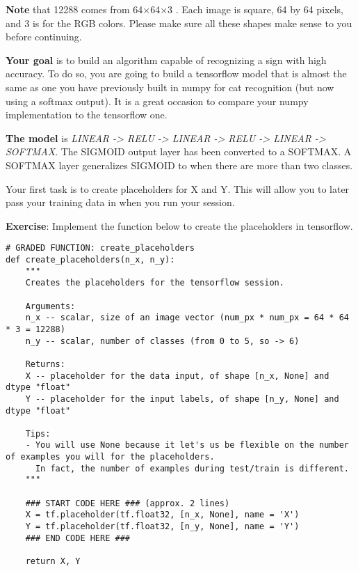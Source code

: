 {\textbf {Note}} that 12288 comes from  64×64×3 . Each image is square, 64 by 64 pixels, and 3 is for the RGB colors. Please make sure all these shapes make sense to you before continuing.

{\textbf {Your goal }}is to build an algorithm capable of recognizing a sign with high accuracy. To do so, you are going to build a tensorflow model that is almost the same as one you have previously built in numpy for cat recognition (but now using a softmax output). It is a great occasion to compare your numpy implementation to the tensorflow one.

{\textbf {The model }}is \emph{LINEAR -> RELU -> LINEAR -> RELU -> LINEAR -> SOFTMAX}. The SIGMOID output layer has been converted to a SOFTMAX. A SOFTMAX layer generalizes SIGMOID to when there are more than two classes.






Your first task is to create placeholders for X and Y. This will allow you to later pass your training data in when you run your session.

{\textbf {Exercise}}: Implement the function below to create the placeholders in tensorflow.

\begin{verbatim} 
# GRADED FUNCTION: create_placeholders
def create_placeholders(n_x, n_y):
    """
    Creates the placeholders for the tensorflow session.
    
    Arguments:
    n_x -- scalar, size of an image vector (num_px * num_px = 64 * 64 * 3 = 12288)
    n_y -- scalar, number of classes (from 0 to 5, so -> 6)
    
    Returns:
    X -- placeholder for the data input, of shape [n_x, None] and dtype "float"
    Y -- placeholder for the input labels, of shape [n_y, None] and dtype "float"
    
    Tips:
    - You will use None because it let's us be flexible on the number of examples you will for the placeholders.
      In fact, the number of examples during test/train is different.
    """

    ### START CODE HERE ### (approx. 2 lines)
    X = tf.placeholder(tf.float32, [n_x, None], name = 'X')
    Y = tf.placeholder(tf.float32, [n_y, None], name = 'Y')
    ### END CODE HERE ###
    
    return X, Y
\end{verbatim}     


